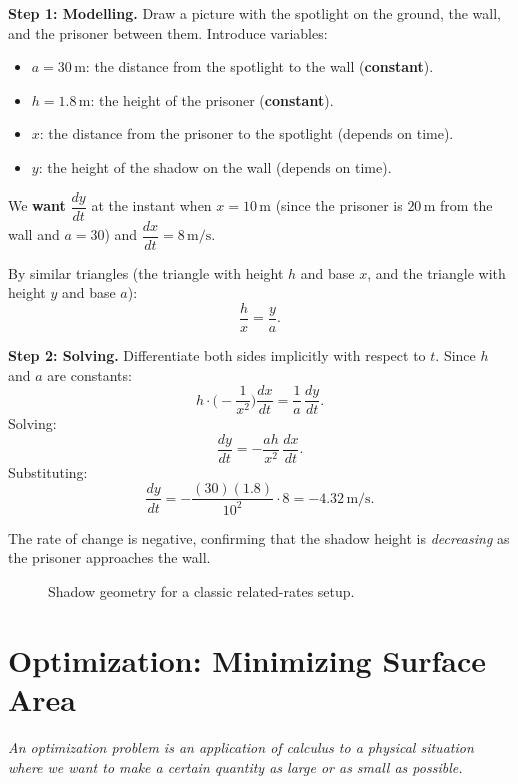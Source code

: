 \textbf{Step 1: Modelling.}  Draw a picture with the spotlight on the ground, the wall, and the prisoner between them.  Introduce variables:
\begin{itemize}
  \item $a = 30\,\text{m}$: the distance from the spotlight to the wall (\textbf{constant}).
  \item $h = 1.8\,\text{m}$: the height of the prisoner (\textbf{constant}).
  \item $x$: the distance from the prisoner to the spotlight (depends on time).
  \item $y$: the height of the shadow on the wall (depends on time).
\end{itemize}
We \textbf{want} $\dfrac{dy}{dt}$ at the instant when $x = 10\,\text{m}$ (since the prisoner is $20\,\text{m}$ from the wall and $a = 30$) and $\dfrac{dx}{dt} = 8\,\text{m/s}$.

By similar triangles (the triangle with height $h$ and base $x$, and the triangle with height $y$ and base $a$):
\[
  \frac{h}{x} = \frac{y}{a}.
\]

\textbf{Step 2: Solving.}  Differentiate both sides implicitly with respect to $t$.  Since $h$ and $a$ are constants:
\[
  h\cdot\biggl(-\frac{1}{x^{2}}\biggr)\frac{dx}{dt} = \frac{1}{a}\,\frac{dy}{dt}.
\]
Solving:
\[
  \frac{dy}{dt} = -\frac{ah}{x^{2}}\,\frac{dx}{dt}.
\]
Substituting:
\[
  \frac{dy}{dt} = -\frac{(30)(1.8)}{10^{2}}\cdot 8 = -4.32\,\text{m/s}.
\]

The rate of change is negative, confirming that the shadow height is \emph{decreasing} as the prisoner approaches the wall.

\begin{figure}[ht]
  \centering
  
  \caption{Shadow geometry for a classic related-rates setup.}
  \label{fig:related-rates-shadow}
\end{figure}

\section{Optimization: Minimizing Surface Area}
\label{sec:6.3}

\textit{An optimization problem is an application of calculus to a physical situation where we want to make a certain quantity as large or as small as possible.}

